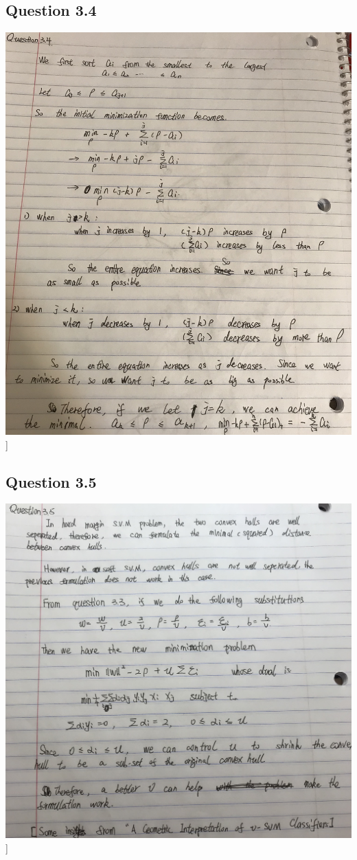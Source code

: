 \documentclass[11pt]{article} %
\begin{document}
\subsection{Question 3.4}
\includegraphics[scale=0.16]{q34.jpeg}]

\subsection{Question 3.5}
\includegraphics[scale=0.16]{q35.jpeg}]
\end{document}
